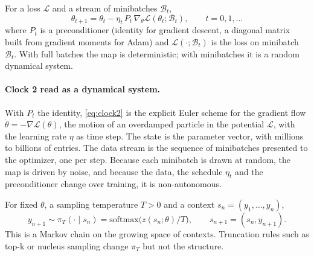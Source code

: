 \begin{definition}
\label{def:clock2}
For a loss $\mathcal{L}$ and a stream of minibatches $\mathcal{B}_t$,
\begin{equation}
\theta_{t+1} = \theta_t - \eta_t\, P_t\, \nabla_\theta \mathcal{L}(\theta_t;\mathcal{B}_t), \qquad t = 0,1,\dots
\label{eq:clock2}
\end{equation}
where $P_t$ is a preconditioner (identity for gradient descent, a diagonal matrix built from gradient moments for Adam) and $\mathcal{L}(\cdot;\mathcal{B}_t)$ is the loss on minibatch $\mathcal{B}_t$. With full batches the map is deterministic; with minibatches it is a random dynamical system.
\end{definition}

\paragraph{Clock 2 read as a dynamical system.} With $P_t$ the identity, \eqref{eq:clock2} is the explicit Euler scheme for the gradient flow $\dot\theta=-\nabla\mathcal L(\theta)$, the motion of an overdamped particle in the potential $\mathcal L$, with the learning rate $\eta$ as time step. The state is the parameter vector, with millions to billions of entries. The data stream is the sequence of minibatches presented to the optimizer, one per step. Because each minibatch is drawn at random, the map is driven by noise, and because the data, the schedule $\eta_t$ and the preconditioner change over training, it is non-autonomous.

\begin{definition}
\label{def:clock3}
For fixed $\theta$, a sampling temperature $T>0$ and a context $s_n=(y_1,\dots,y_n)$,
\begin{equation}
y_{n+1}\sim \pi_T(\cdot\mid s_n) = \mathrm{softmax}\big(z(s_n;\theta)/T\big), \qquad s_{n+1} = (s_n, y_{n+1}).
\label{eq:clock3}
\end{equation}
This is a Markov chain on the growing space of contexts. Truncation rules such as top-k or nucleus sampling change $\pi_T$ but not the structure.
\end{definition}

